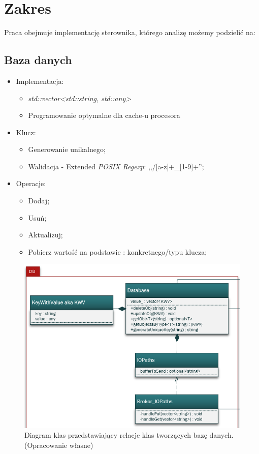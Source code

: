 \section{Zakres}
Praca obejmuje implementację sterownika, którego analizę możemy podzielić na:

\subsection{Baza danych}
\begin{itemize}
	\item Implementacja:
	\begin{itemize}
		\item \textit{std::vector<std::string, std::any>}
		\item Programowanie optymalne dla cache-u procesora
	\end{itemize}
	\item Klucz:
	\begin{itemize}
		\item Generowanie unikalnego;
		\item Walidacja - Extended \textit{POSIX Regexp}: ,,/[a-z]+\_[1-9]+'';
	\end{itemize}
	\item Operacje:
	\begin{itemize}
		\item Dodaj;
		\item Usuń;
		\item Aktualizuj;
		\item Pobierz wartość na podstawie : konkretnego/typu klucza;
	\end{itemize}
\end{itemize}
\begin{figure}[h!]
    \centering
    \includegraphics[scale=0.90]{Obrazki/DiagramyKlas/DB.png}
    \caption{Diagram klas przedstawiający relacje klas tworzących bazę danych.
        \newline(Opracowanie własne)}
\end{figure}

